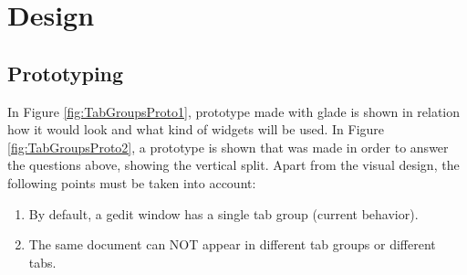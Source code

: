 \newpage

\section{Design}

\subsection{Prototyping}

In Figure \ref{fig:TabGroupsProto1},   prototype made with glade is shown in relation how it would look and what kind of widgets will be used. 
In Figure \ref{fig:TabGroupsProto2},  a prototype is shown that was made in order to answer the questions above, showing the vertical split. 
Apart from the visual design, the following points must be taken into account:
\begin{enumerate}
  \item By default, a gedit window has a single tab group (current behavior).
  \item The same document can NOT appear in different tab groups or different tabs.
\end{enumerate}

